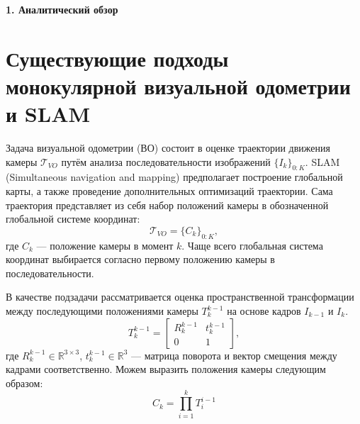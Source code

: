 \newpage
\begin{center}
  \textbf{\large 1. Аналитический обзор }
\end{center}


\section{Существующие подходы монокулярной визуальной одометрии и SLAM}
Задача визуальной одометрии (ВО) состоит в оценке траектории движения камеры 
$\mathcal{T}_{VO}$ путём анализа последовательности изображений 
$\{I_k\}_{0:K}$. SLAM (Simultaneous navigation and mapping) предполагает 
построение глобальной карты, а также проведение дополнительных оптимизаций траектории.
Сама траектория представляет из себя набор положений камеры 
в обозначенной глобальной системе координат:
\begin{equation}
    \mathcal{T}_{VO} = \{C_k\}_{0:K},
\end{equation}
где $C_k$ --- положение камеры в момент $k$. Чаще всего глобальная 
система координат выбирается согласно первому положению камеры в 
последовательности.

В качестве подзадачи рассматривается оценка пространственной трансформации 
между последующими положениями камеры $T_k^{k-1}$ на основе кадров $I_{k-1}$ 
и $I_k$.
\begin{equation}
    T_k^{k-1} = \begin{bmatrix}R_k^{k-1} & t_k^{k-1} \\ 0 & 1\end{bmatrix},
\end{equation}
где $R_k^{k-1} \in \mathbb{R}^{3\times 3}$, $t_k^{k-1} \in \mathbb{R}^3$ --- 
матрица поворота и вектор смещения между кадрами соответственно. Можем выразить 
положения камеры следующим образом:
\begin{equation}
    C_k = \prod\limits_{i=1}^k T_i^{i-1}
\end{equation}

